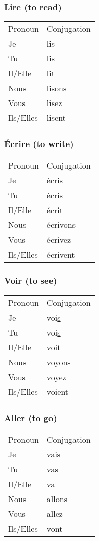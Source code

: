 \subsubsection{Lire (to read)}
\begin{tabular}{| l | l |}
\hline
Pronoun 	& 	Conjugation	\\
Je		&	lis		\\
Tu		&	lis		\\
Il/Elle		&	lit		\\
Nous		&	lisons		\\
Vous		&	lisez		\\
Ils/Elles	&	lisent		\\
\hline
\end{tabular}

\subsubsection{\'Ecrire (to write)}
\begin{tabular}{| l | l |}
\hline
Pronoun 	& 	Conjugation	\\
Je		&	\'ecris		\\
Tu		&	\'ecris		\\
Il/Elle		&	\'ecrit		\\
Nous		&	\'ecrivons	\\
Vous		&	\'ecrivez	\\
Ils/Elles	&	\'ecrivent	\\
\hline
\end{tabular}


\subsubsection{Voir (to see)}
\begin{tabular}{| l | l |}
\hline
Pronoun 	& 	Conjugation	\\
Je		    &	voi\ul{s}	\\
Tu		    &	voi\ul{s}	\\
Il/Elle		&	voi\ul{t}	\\
Nous		&	voyons		\\
Vous		&	voyez		\\
Ils/Elles	&	voi\ul{ent}	\\
\hline
\end{tabular}

\subsubsection{Aller (to go)}
\begin{tabular}{| l | l |}
\hline
Pronoun 	& 	Conjugation	\\
Je		    &	vais		\\
Tu		    &	vas		\\
Il/Elle		&	va		\\
Nous		&	allons		\\
Vous		&	allez		\\
Ils/Elles	&	vont		\\
\hline
\end{tabular}

